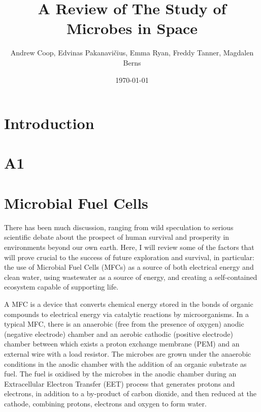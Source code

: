 \documentclass[12pt]{article}
\title{A Review of The Study of Microbes in Space}
\author{Andrew Coop, Edvinas Pakanavičius, Emma Ryan, Freddy Tanner, Magdalen Berns}
\date{\today}
\begin{document}
\maketitle
\thispagestyle{empty}

\begin{abstract}
\noindent

\end{abstract}

\clearpage
\tableofcontents
\thispagestyle{empty}
\clearpage

\section{Introduction}
\section{A1}

\section{Microbial Fuel Cells}
There has been much discussion, ranging from wild speculation to serious scientific debate about the prospect of human survival and prosperity in environments beyond our own earth. Here, I will review some of the factors that will prove crucial to the success of future exploration and survival, in particular: the use of Microbial Fuel Cells (MFCs) as a source of both electrical energy and clean water, using wastewater as a source of energy, and creating a self-contained ecosystem capable of supporting life. 

A MFC is a device that converts chemical energy stored in the bonds of organic compounds to electrical energy via catalytic reactions by microorganisms. In a typical MFC, there is an anaerobic (free from the presence of oxygen) anodic (negative electrode) chamber and an aerobic cathodic (positive electrode) chamber between which exists a proton exchange membrane (PEM) and an external wire with a load resistor. The microbes are grown under the anaerobic conditions in the anodic chamber with the addition of an organic substrate as fuel.  The fuel is oxidised by the microbes in the anodic chamber during an Extracellular Electron Transfer (EET) process that generates protons and electrons, in addition to a by-product of carbon dioxide, and then reduced at the cathode, combining protons, electrons and oxygen to form water. \cite{du2007state,logan2006microbial}

\end{document}
